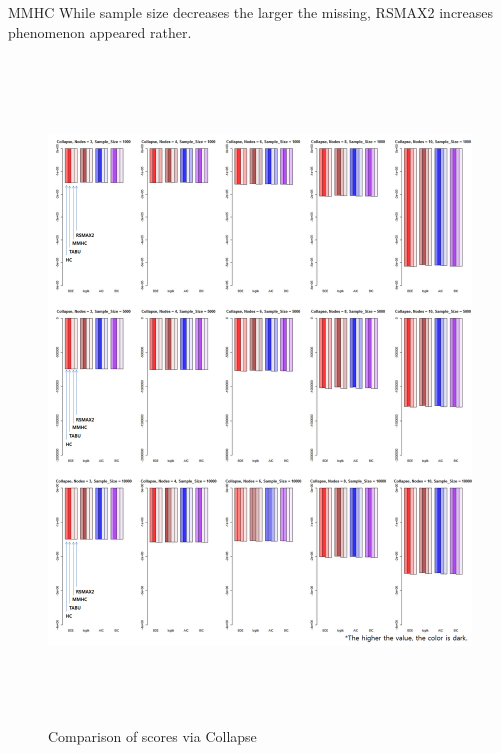 MMHC While sample size decreases the larger the missing, RSMAX2 increases phenomenon appeared rather.
	
	\begin{figure}[p]
	\centering
		\includegraphics[height=500pt]{01_Collapse_Score}
		\caption{Comparison of scores via Collapse}
	\end{figure}	

